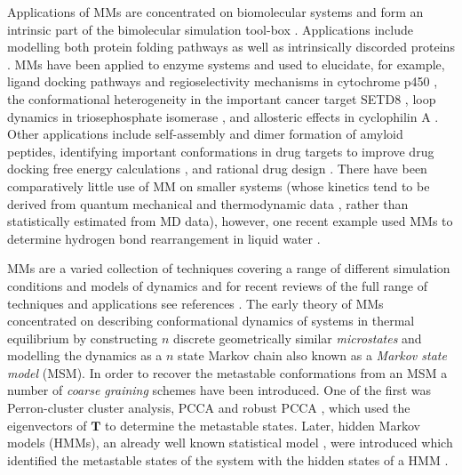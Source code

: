 Applications of MMs are concentrated on biomolecular systems and form an intrinsic part of the bimolecular simulation tool-box \cite{hugginsBiomolecularSimulationsDynamics2019}. Applications include modelling both protein folding pathways \cite{singhalUsingPathSampling2004,swopeDescribingProteinFolding2004} as well as intrinsically discorded proteins \cite{schorAnalyticalMethodsStructural2016a}. 
MMs have been applied to enzyme systems and used to elucidate, for example, ligand docking pathways \cite{ahalawatMappingSubstrateRecognition2018a} and regioselectivity mechanisms in cytochrome p450 \cite{dodaniDiscoveryRegioselectivitySwitch2016a}, the conformational heterogeneity in the important cancer target SETD8 \cite{chenDynamicConformationalLandscape2019a}, loop dynamics in triosephosphate isomerase \cite{LoopMotionTriosephosphate}, and allosteric effects in cyclophilin A \cite{wapeesittipanAllostericEffectsCyclophilin2019}. Other applications include self-assembly \cite{senguptaAutomatedMarkovState2019} and dimer formation \cite{leahyCoarseMasterEquations2016} of amyloid peptides, identifying important conformations in drug targets to improve drug docking free energy calculations \cite{amaroEnsembleDockingDrug2018}, and rational drug design \cite{gervasioBiomolecularSimulationsStructureBased2019}. There have been comparatively little use of MM on smaller systems (whose kinetics tend to be derived from quantum mechanical and thermodynamic data \cite{glowackiMESMEROpenSourceMaster2012, pillingMasterEquationModels2003}, rather than statistically estimated from MD data), however, one recent example used MMs to determine hydrogen bond rearrangement in liquid water \cite{schulzCollectiveHydrogenbondRearrangement2018}. 

MMs are a varied collection of techniques covering a range of different simulation conditions and models of dynamics and for recent reviews of the full range of techniques and applications see references \cite{husicMarkovStateModels2018, noeMarkovModelsMolecular2019b}. The early theory of MMs concentrated on describing conformational dynamics of systems in thermal equilibrium by constructing $n$ discrete geometrically similar \emph{microstates} and modelling the dynamics as a $n$ state Markov chain \cite{singhalUsingPathSampling2004, swopeDescribingProteinFolding2004, prinzMarkovModelsMolecular2011} also known as a \emph{Markov state model} (MSM). In order to recover the metastable conformations from an MSM a number of \emph{coarse graining} schemes have been introduced. One of the first was Perron-cluster cluster analysis, PCCA \cite{deuflhardIdentificationAlmostInvariant2000a} and robust PCCA \cite{deuflhardRobustPerronCluster2005b}, which used the eigenvectors of $\mathbf{T}$ to determine the metastable states. Later, hidden Markov models (HMMs), an already well known statistical model \cite{rabinerTutorialHiddenMarkov1989}, were introduced  which  identified the metastable states of the system with the hidden states of a HMM \cite{noeMarkovModelsMolecular2019b}. 

